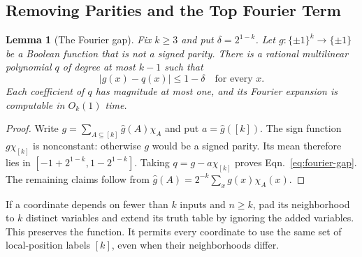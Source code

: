 \documentclass[letterpaper,11pt]{article}
\newtheorem{lemma}[theorem]{Lemma}
\theoremstyle{definition}
\begin{document}
\subsection{Removing Parities and the Top Fourier Term}

\begin{lemma}[The Fourier gap]
\label{lem:fourier-gap}
Fix $k\ge3$ and put $\delta=2^{1-k}$. Let
$g:\{\pm1\}^k\to\{\pm1\}$ be a Boolean function that is
not a signed parity. There is a rational multilinear polynomial
$q$ of degree at most $k-1$ such that
\begin{equation}
 |g(x)-q(x)|\le1-\delta\quad\text{for every }x.
 \label{eq:fourier-gap}
\end{equation}
Each coefficient of $q$ has magnitude at most one, and its Fourier
expansion is computable in $O_k(1)$ time.
\end{lemma}
\begin{proof}
Write $g=\sum_{A\subseteq[k]}\widehat g(A)\chi_A$ and put
$a=\widehat g([k])$. The sign function $g\chi_{[k]}$ is
nonconstant: otherwise $g$ would be a signed parity. Its mean
therefore lies in $[-1+2^{1-k},1-2^{1-k}]$. Taking
$q=g-a\chi_{[k]}$ proves Eqn.~\eqref{eq:fourier-gap}.
The remaining claims follow from
$\widehat g(A)=2^{-k}\sum_xg(x)\chi_A(x)$.
\end{proof}

If a coordinate depends on fewer than $k$ inputs and $n\ge k$,
pad its neighborhood to $k$ distinct variables and extend its truth
table by ignoring the added variables. This preserves the function.
It permits every coordinate to use the same set of local-position
labels $[k]$, even when their neighborhoods differ.
\end{document}
